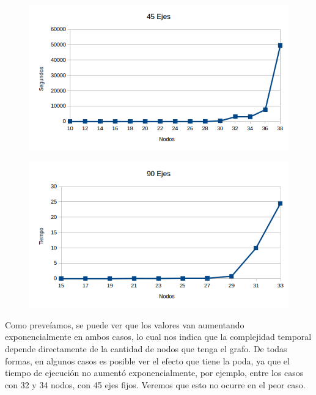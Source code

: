    \begin{figure}[h!]
   \begin{center}
 	\includegraphics[scale=0.7]{imagenes/exacto/45Ejes.png}
	\label{45Ejes}
   \end{center}
 \end{figure}
 
    \begin{figure}[h!]
   \begin{center}
 	\includegraphics[scale=0.7]{imagenes/exacto/90Ejes.png}
	\label{30Nodos}
   \end{center}
 \end{figure}
 
Como preve\'iamos, se puede ver que los valores van aumentando exponencialmente en ambos casos, lo cual nos indica que la complejidad temporal depende directamente de la cantidad de nodos que tenga
el grafo.
De todas formas, en algunos casos es posible ver el efecto que tiene la poda, ya que el tiempo de ejecuci\'on no aument\'o exponencialmente, por ejemplo, entre los casos con 32 y 34 nodos, con 45 ejes fijos.
Veremos que esto no ocurre en el peor caso.\\


